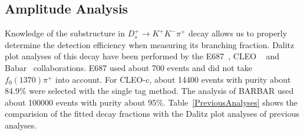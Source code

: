 \subsection{Amplitude Analysis}
\par{
    Knowledge of the substructure in $D_{s}^{+} \rightarrow K^{+}K^{-}\pi^{+}$ decay allows us to properly determine the detection efficiency when measuring its branching fraction.
    Dalitz plot analyses of this decay have been performed by the E687~\cite{E687RES}, CLEO ~\cite{2009CLEO} and Babar~\cite{2011BARBAR} collaborations.
    E687 used about 700 events and did not take $f_{0}(1370)\pi^{+}$ into account. 
    For CLEO-c, about 14400 events with purity about 84.9\% were selected with the single tag method.
    The analysis of BARBAR used about 100000 events with purity about 95\%. 
    Table~\ref{PreviousAnalyses} shows the comparision of the fitted decay fractions with the Dalitz plot analyses of previous analyses.
}

